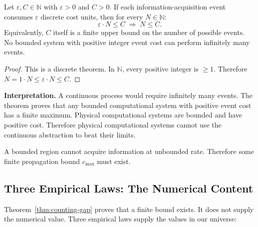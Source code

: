 \begin{theorem}\label{thm:counting-gap}
Let $\varepsilon, C \in \mathbb{N}$ with $\varepsilon > 0$ and $C > 0$. If each information-acquisition event consumes $\varepsilon$ discrete cost units, then for every $N \in \mathbb{N}$:
\[
  \varepsilon \cdot N \leq C \;\Rightarrow\; N \leq C.
\]
Equivalently, $C$ itself is a finite upper bound on the number of possible events. No bounded system with positive integer event cost can perform infinitely many events.

\begin{proof}
This is a discrete theorem. In $\mathbb{N}$, every positive integer is $\geq 1$. Therefore $N = 1 \cdot N \leq \varepsilon \cdot N \leq C$.
\end{proof}
\end{theorem}

\noindent\textbf{Interpretation.} A continuous process would require infinitely many events. The theorem proves that any bounded computational system with positive event cost has a finite maximum. Physical computational systems are bounded and have positive cost. Therefore physical computational systems cannot use the continuous abstraction to beat their limits.

\begin{corollary}\label{cor:forced-finite-speed}
A bounded region cannot acquire information at unbounded rate. Therefore some finite propagation bound $c_{\max}$ must exist.
\end{corollary}

\subsection{Three Empirical Laws: The Numerical Content}\label{sec:three-laws}

Theorem~\ref{thm:counting-gap} proves that a finite bound exists. It does not supply the numerical value. Three empirical laws supply the values in our universe:

